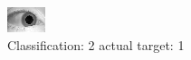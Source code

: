 \begin{figure}[h!]
\begin{center}
\includegraphics[width=0.60\columnwidth]{figures/ID1473_class_2_target_1.png}
\end{center}
\caption{ Classification: 2 actual target: 1}
\label{fig:ID1473_class_2_target_1}
\end{figure}
